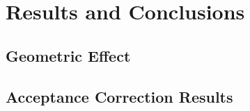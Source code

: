 \section{Results and Conclusions} \label{sec::resultsandconclusions}
\subsection{Geometric Effect}

\subsection{Acceptance Correction Results}


